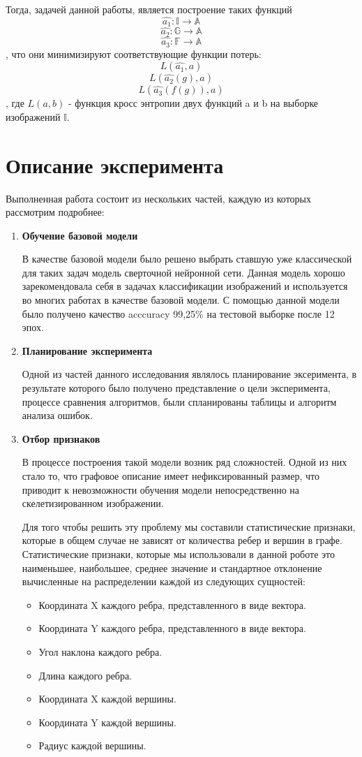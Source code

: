 \documentclass[12pt, twoside]{article}
\begin{document}
Тогда, задачей данной работы, является построение таких функций
 $$\hat{a_1}: \mathbb{I} \rightarrow \mathbb{A}$$
 $$ \hat{a_2}: \mathbb{G} \rightarrow \mathbb{A} $$ 
 $$\hat{a_3}: \mathbb{F} \rightarrow \mathbb{A}$$
 , что они минимизируют соответствующие функции потерь:
 $$L(\hat{a_1}, a)$$
 $$L(\hat{a_2}(g), a)$$ 
 $$L(\hat{a_3}(f(g)), a)$$
 , где $L(a, b)$ - функция кросс энтропии двух функций a и b на выборке изображений $\mathbb{I}$.
 
 
 \section{Описание эксперимента}
 Выполненная работа состоит из нескольких частей, каждую из которых рассмотрим подробнее:
 \begin{enumerate}
 \item \textbf{Обучение базовой модели}
 
 В качестве базовой модели было решено выбрать ставшую уже классической для таких задач модель сверточной нейронной сети. Данная модель хорошо зарекомендовала себя в задачах классификации изображений и используется во многих работах в качестве базовой модели. С помощью данной модели было получено качество acccuracy 99,25\% на тестовой выборке после 12 эпох.

 
\item \textbf{Планирование эксперимента}

Одной из частей данного исследования являлось планирование эксеримента, в результате которого было получено представление о цели эксперимента, процессе сравнения алгоритмов, были спланированы таблицы и алгоритм анализа ошибок. 
 
 
 \item \textbf{Отбор признаков}
 
 В процессе построения такой модели возник ряд сложностей. Одной из них стало то, что графовое описание имеет нефиксированный размер, что приводит к невозможности обучения модели непосредственно на скелетизированном изображении. 
 
Для того чтобы решить эту проблему мы составили статистические признаки, которые в общем случае не зависят от количества ребер и вершин в графе. Статистические признаки, которые мы использовали в данной роботе это наименьшее, наибольшее, среднее значение и стандартное отклонение вычисленные на распределении каждой из следующих сущностей:
 
 \begin{itemize}
 \item Координата X каждого ребра, представленного в виде вектора.
 \item Координата Y каждого ребра, представленного в виде вектора.
 \item Угол наклона каждого ребра.
 \item Длина каждого ребра.
 \item Координата X каждой вершины.
 \item Координата Y каждой вершины.
 \item Радиус каждой вершины.
 \end{itemize}
 

\end{enumerate}
\end{document}
